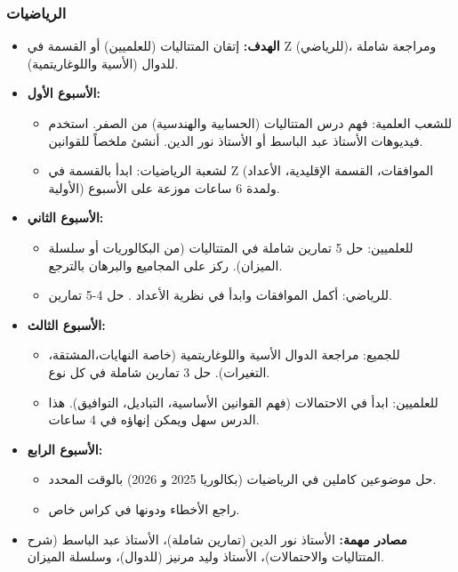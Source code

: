 \documentclass[12pt,a4paper]{book}
\begin{document}
	\subsubsection*{الرياضيات}
	\begin{itemize}
		\item \textbf{الهدف:} إتقان المتتاليات (للعلميين) أو القسمة في Z (للرياضي)، ومراجعة شاملة للدوال (الأسية واللوغاريتمية).
		\item \textbf{الأسبوع الأول:} 
		\begin{itemize}
			\item للشعب العلمية: فهم درس المتتاليات (الحسابية والهندسية) من الصفر. استخدم فيديوهات الأستاذ عبد الباسط أو الأستاذ نور الدين. أنشئ ملخصاً للقوانين.
			\item لشعبة الرياضيات: ابدأ بالقسمة في Z (الموافقات، القسمة الإقليدية، الأعداد الأولية) ولمدة 6 ساعات موزعة على الأسبوع.
		\end{itemize}
		\item \textbf{الأسبوع الثاني:}
		\begin{itemize}
			\item للعلميين: حل 5 تمارين شاملة في المتتاليات (من البكالوريات أو سلسلة الميزان). ركز على المجاميع والبرهان بالترجع.
			\item للرياضي: أكمل الموافقات وابدأ في نظرية الأعداد . حل 4-5 تمارين.
		\end{itemize}

		\item \textbf{الأسبوع الثالث:}
		\begin{itemize}
			\item للجميع: مراجعة الدوال الأسية واللوغاريتمية (خاصة النهايات،\newline  المشتقة، التغيرات). حل 3 تمارين شاملة في كل نوع.
			\item للعلميين: ابدأ في الاحتمالات (فهم القوانين الأساسية، التباديل، التوافيق). هذا الدرس سهل ويمكن إنهاؤه في 4 ساعات.
		\end{itemize}
		\item \textbf{الأسبوع الرابع:}
		\begin{itemize}
			\item حل موضوعين كاملين في الرياضيات (بكالوريا 2025 و 2026) بالوقت المحدد.
			\item راجع الأخطاء ودونها في كراس خاص.
		\end{itemize}
		\item \textbf{مصادر مهمة:} الأستاذ نور الدين (تمارين شاملة)، الأستاذ عبد الباسط (شرح المتتاليات والاحتمالات)، الأستاذ وليد مرنيز (للدوال)، وسلسلة الميزان.
	\end{itemize}
	
\end{document}
